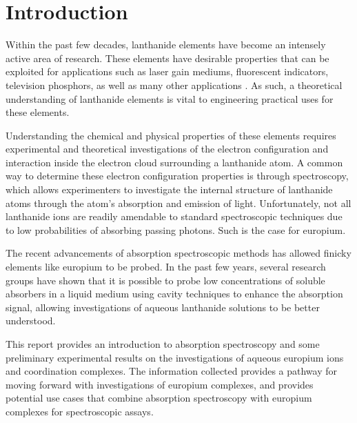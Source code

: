 \chapter*{Introduction}  \label{chap:intro}

Within the past few decades, lanthanide elements have become an intensely
active area of research. These elements have desirable properties that can be
exploited for applications such as laser gain mediums, fluorescent indicators,
television phosphors, as well as many other applications \cite{Bunzli:2005ic}.
As such, a theoretical understanding of lanthanide elements is vital to
engineering practical uses for these elements.

Understanding the chemical and physical properties of these elements requires
experimental and theoretical investigations of the electron configuration and
interaction inside the electron cloud surrounding a lanthanide atom. A common
way to determine these electron configuration properties is through
spectroscopy, which allows experimenters to investigate the internal structure
of lanthanide atoms through the atom's absorption and emission of light.
Unfortunately, not all lanthanide ions are readily amendable to standard
spectroscopic techniques due to low probabilities of absorbing passing
photons.  Such is the case for europium.

The recent advancements of absorption spectroscopic methods has allowed finicky
elements like europium to be probed. In the past few years, several research
groups have shown that it is possible to probe low concentrations of soluble
absorbers in a liquid medium using cavity techniques to enhance the absorption
signal, allowing investigations of aqueous lanthanide solutions to be better
understood.

This report provides an introduction to absorption spectroscopy and some
preliminary experimental results on the investigations of aqueous europium ions
and coordination complexes. The information collected provides a pathway for
moving forward with investigations of europium complexes, and provides
potential use cases that combine absorption spectroscopy with europium
complexes for spectroscopic assays.



